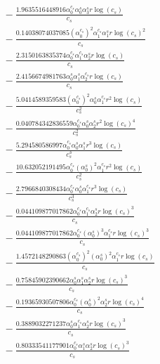 \documentclass[10pt]{article}
\begin{document}
\begin{align*}
&{}  - \frac{1.9635516448916 \alpha_{0}^{c_s} \alpha_{0}^s \alpha_{3}^s r \log{\left(c_{s} \right)}}{c_{s}} \\
&{}  - \frac{0.14038074037085 \left(\alpha_{0}^{c_s}\right)^{2} \alpha_{1}^{c_s} \alpha_{1}^s r \log{\left(c_{s} \right)}^{2}}{c_{s}} \\
&{}  - \frac{2.3150163835374 \alpha_{0}^{c_s} \alpha_{1}^{c_s} \alpha_{2}^s r \log{\left(c_{s} \right)}}{c_{s}} \\
&{}  - \frac{2.4156674981763 \alpha_{0}^s \alpha_{1}^s \alpha_{2}^{c_s} r \log{\left(c_{s} \right)}}{c_{s}} \\
&{}  - \frac{5.0414589359583 \left(\alpha_{0}^{c_s}\right)^{2} \alpha_{0}^s \alpha_{1}^{c_s} r^{2} \log{\left(c_{s} \right)}}{c_{s}^{2}} \\
&{}  - \frac{0.040784342836559 \alpha_{0}^{c_s} \alpha_{0}^s \alpha_{2}^s r^{2} \log{\left(c_{s} \right)}^{4}}{c_{s}^{2}} \\
&{}  - \frac{5.294580586997 \alpha_{0}^{c_s} \alpha_{0}^s \alpha_{1}^s r^{3} \log{\left(c_{s} \right)}}{c_{s}^{3}} \\
&{}  - \frac{10.632052191495 \alpha_{0}^{c_s} \left(\alpha_{0}^s\right)^{2} \alpha_{1}^{c_s} r^{2} \log{\left(c_{s} \right)}}{c_{s}^{2}} \\
&{}  - \frac{2.7966840308434 \alpha_{0}^{c_s} \alpha_{0}^s \alpha_{1}^{c_s} r^{3} \log{\left(c_{s} \right)}}{c_{s}^{3}} \\
&{}  - \frac{0.044109877017862 \alpha_{0}^{c_s} \alpha_{1}^{c_s} \alpha_{2}^s r \log{\left(c_{s} \right)}^{3}}{c_{s}} \\
&{}  - \frac{0.044109877017862 \alpha_{0}^{c_s} \left(\alpha_{0}^s\right)^{3} \alpha_{1}^{c_s} r \log{\left(c_{s} \right)}^{3}}{c_{s}} \\
&{}  - \frac{1.4572148290863 \left(\alpha_{0}^{c_s}\right)^{2} \left(\alpha_{0}^s\right)^{2} \alpha_{1}^{c_s} r \log{\left(c_{s} \right)}}{c_{s}} \\
&{}  - \frac{0.75845902390662 \alpha_{0}^s \alpha_{1}^s \alpha_{2}^s r \log{\left(c_{s} \right)}^{3}}{c_{s}} \\
&{}  - \frac{0.19365930507806 \alpha_{0}^{c_s} \left(\alpha_{0}^s\right)^{2} \alpha_{2}^s r \log{\left(c_{s} \right)}^{4}}{c_{s}} \\
&{}  - \frac{0.3889032271237 \alpha_{0}^s \alpha_{1}^{c_s} \alpha_{2}^s r \log{\left(c_{s} \right)}^{3}}{c_{s}} \\
&{}  - \frac{0.80333541177901 \alpha_{0}^{c_s} \alpha_{1}^s \alpha_{2}^s r \log{\left(c_{s} \right)}^{3}}{c_{s}} \\

\end{align*}
\end{document}
